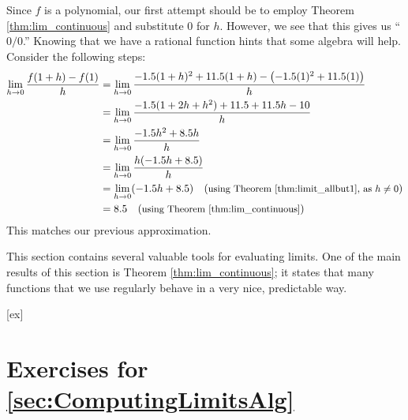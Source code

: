 \begin{solution}
{Since $f$ is a polynomial, our first attempt should be to employ Theorem \ref{thm:lim_continuous} and substitute 0 for $h$. However, we see that this gives us ``$0/0$.'' %
 Knowing that we have a rational function hints that some algebra will help. Consider the following steps:
		\begin{align*}
		\lim_{h\to 0}\frac{f(1+h)-f(1)}{h} 	&= 	\lim_{h\to 0}\frac{-1.5(1+h)^2 + 11.5(1+h) - \left(-1.5(1)^2+11.5(1)\right)}{h} \\
																				&=	\lim_{h\to 0}\frac{-1.5(1+2h+h^2) + 11.5+11.5h - 10}{h}\\
																				&=	\lim_{h\to 0}\frac{-1.5h^2 +8.5h}{h}\\
																				&= 	\lim_{h\to 0}\frac{h(-1.5h+8.5)}h\\
																				&=	\lim_{h\to 0}(-1.5h+8.5) \quad (\text{\small using Theorem \ref{thm:limit_allbut1}, as $h\neq 0$}) \\
																				&= 	8.5 \quad (\text{\small using Theorem \ref{thm:lim_continuous}})
		\end{align*}																		
This matches our previous approximation.
}
\end{solution}



This section contains several valuable tools for evaluating limits. One of the main results of this section is Theorem \ref{thm:lim_continuous}; it states that many functions that we use regularly behave in a very nice, predictable way.












[ex]
\section*{Exercises for \ref{sec:ComputingLimitsAlg}}

